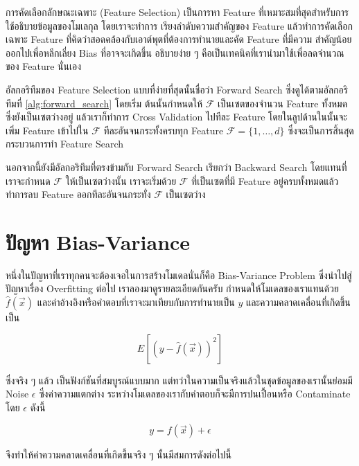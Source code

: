 การคัดเลือกลักษณะเฉพาะ (Feature Selection) เป็นการหา Feature ที่เหมาะสมที่สุดสำหรับการใช้อธิบายข้อมูลของโมเลกุล โดยเราจะทำการ%
เรียงลำดับความสำคัญของ Feature แล้วทำการคัดเลือกเฉพาะ Feature ที่คิดว่าสอดคล้องกับเอาต์พุตที่ต้องการทำนายและคัด Feature ที่มีความ%
สำคัญน้อยออกไปเพื่อหลีกเลี่ยง Bias ที่อาจจะเกิดขึ้น อธิบายง่าย ๆ คือเป็นเทคนิคที่เรานำมาใช้เพื่อลดจำนวณของ Feature นั่นเอง 

อัลกอริทึมของ Feature Selection แบบที่ง่ายที่สุดนั้นชื่อว่า Forward Search ซึ่งดูได้ตามอัลกอริทึมที่ \ref{alg:forward_search} โดยเริ่ม%
ต้นนั้นกำหนดให้ $\mathcal{F}$ เป็นเซตของจำนวน Feature ทั้งหมดซึ่งยังเป็นเซตว่างอยู่ แล้วเราก็ทำการ Cross Validation ไปทีละ Feature
โดยในลูปด้านในนั้นจะเพิ่ม Feature เข้าไปใน $\mathcal{F}$ ทีละอันจนกระทั้งครบทุก Feature $\mathcal{F} = \{1,\ldots ,d\}$ 
ซึ่งจะเป็นการสิ้นสุดกระบวนการทำ Feature Search 

นอกจากนี้ยังมีอัลกอริทึมที่ตรงข้ามกับ Forward Search เรียกว่า Backward Search โดยแทนที่เราจะกำหนด $\mathcal{F}$ ให้เป็นเซตว่างนั้น%
เราจะเริ่มด้วย $\mathcal{F}$ ที่เป็นเซตที่มี Feature อยู่ครบทั้งหมดแล้วทำการลบ Feature ออกทีละอันจนกระทั่ง $\mathcal{F}$ เป็นเซตว่าง

\section{ปัญหา Bias-Variance}
\label{sec:bias_var_prob}

หนึ่งในปัญหาที่เราทุกคนจะต้องเจอในการสร้างโมเดลนั่นก็คือ Bias-Variance Problem ซึ่งนำไปสู่ปัญหาเรื่อง Overfitting ต่อไป
เราลองมาดูรายละเอียดกันครับ กำหนดให้โมเดลของเราแทนด้วย $\hat{f}(\vec{x})$ และค่าอ้างอิงหรือคำตอบที่เราจะมาเทียบกับการทำนายเป็น 
$y$ และความคลาดเคลื่อนที่เกิดขึ้นเป็น

\begin{equation}
    E\left[\left(y - \hat{f}(\vec{x})\right)^2\right]
\end{equation}

ซึ่งจริง ๆ แล้ว เป็นฟังก์ชันที่สมบูรณ์แบบมาก แต่ทว่าในความเป็นจริงแล้วในชุดข้อมูลของเรานั้นย่อมมี Noise $\epsilon$ ซึ่งค่าความแตกต่าง%
ระหว่างโมเดลของเรากับคำตอบก็จะมีการปนเปื้อนหรือ Contaminate โดย $\epsilon$ ดังนี้

\begin{equation}
    y = f(\vec{x}) + \epsilon
\end{equation}

\noindent จึงทำให้ค่าความคลาดเคลื่อนที่เกิดขึ้นจริง ๆ นั้นมีสมการดังต่อไปนี้ 

